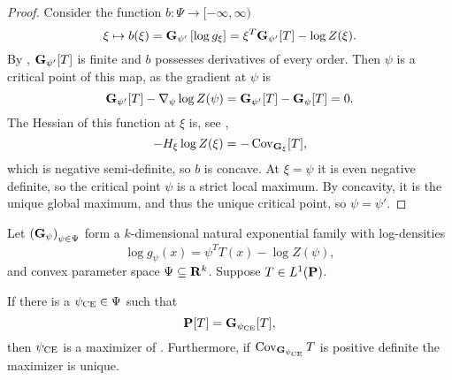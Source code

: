 \begin{proof}
    Consider the function $b: \Psi \to [-\infty, \infty)$
    $$
        \xi \mapsto b(\xi) = \G_{\psi'} \left[ \log g_{\xi} \right] = \xi^{T}\G_{\psi'} [T] - \log Z(\xi).
    $$
    By , $\G_{\psi'}[T]$ is finite and $b$ possesses derivatives of every order.
    Then $\psi$ is a critical point of this map, as the gradient at $\psi$ is
    $$
        \G_{\psi'} [T] - \nabla_{\psi} \log Z(\psi) = \G_{\psi'}[T] - \G_{\psi}[T] = 0.
    $$
    The Hessian of this function at $\xi$ is, see ,
    $$
        -H_{\xi} \log Z(\xi) = - \cov_{\G_{\xi}} [T],
    $$
    which is negative semi-definite, so $b$ is concave. At $\xi = \psi$ it is even negative definite, so the critical point $\psi$ is a strict local maximum. By concavity, it is the unique global maximum, and thus the unique critical point, so $\psi = \psi'$.
\end{proof}

\begin{proposition}
    \label{prop:cem_exponential_families}
    Let $\left( \G_{\psi} \right)_{\psi \in \Psi}$ form a $k$-dimensional natural exponential family with log-densities 
    $$
    \log g_{\psi}(x) = \psi^{T} T(x) - \log Z(\psi),
    $$
    and convex parameter space $\Psi \subseteq \R^{k}$. 
    Suppose $T \in L^{1}(\P)$.

    If there is a $\pce \in \Psi$ such that 
    $$
    \P[T] = \G_{\pce} [T],
    $$
    then $\pce$ is a maximizer of . Furthermore, if $\cov_{\G_{\pce}} T$ is positive definite the maximizer is unique.
\end{proposition}

